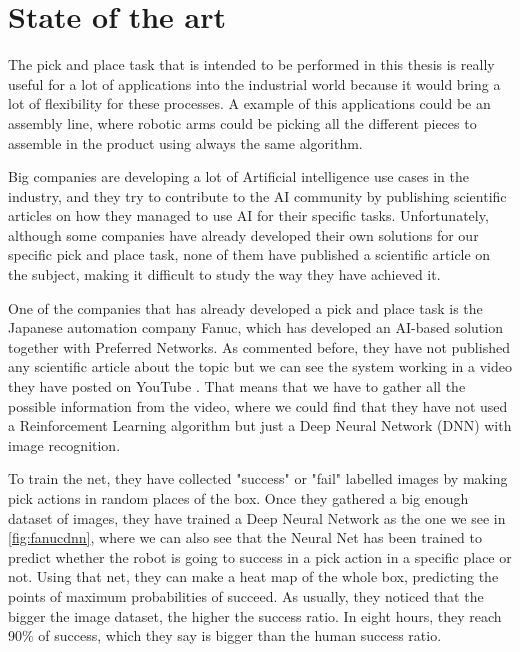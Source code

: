 \chapter{State of the art}
	
	The pick and place task that is intended to be performed in this thesis is really useful for a lot of applications into the industrial world because it would bring a lot of flexibility for these processes. A example of this applications could be an assembly line, where robotic arms could be picking all the different pieces to assemble in the product using always the same algorithm.
	
	Big companies are developing a lot of Artificial intelligence use cases in the industry, and they try to contribute to the AI community by publishing scientific articles on how they managed to use AI for their specific tasks. Unfortunately, although some companies have already developed their own solutions for our specific pick and place task, none of them have published a scientific article on the subject, making it difficult to study the way they have achieved it.
	
	One of the companies that has already developed a pick and place task is the Japanese automation company Fanuc, which has developed an AI-based solution together with Preferred Networks. As commented before, they have not published any scientific article about the topic but we can see the system working in a video they have posted on YouTube \cite{preferred_networks_inc_bin-picking_2015}. That means that we have to gather all the possible information from the video, where we could find that they have not used a Reinforcement Learning algorithm but just a Deep Neural Network (DNN) with image recognition. 
	
	To train the net, they have collected "success" or "fail" labelled images by making pick actions in random places of the box. Once they gathered a big enough dataset of images, they have trained a Deep Neural Network as the one we see in \autoref{fig:fanucdnn}, where we can also see that the Neural Net has been trained to predict whether the robot is going to success in a pick action in a specific place or not. Using that net, they can make a heat map of the whole box, predicting the points of maximum probabilities of succeed. As usually, they noticed that the bigger the image dataset, the higher the success ratio. In eight hours, they reach 90\% of success, which they say is bigger than the human success ratio.
	

